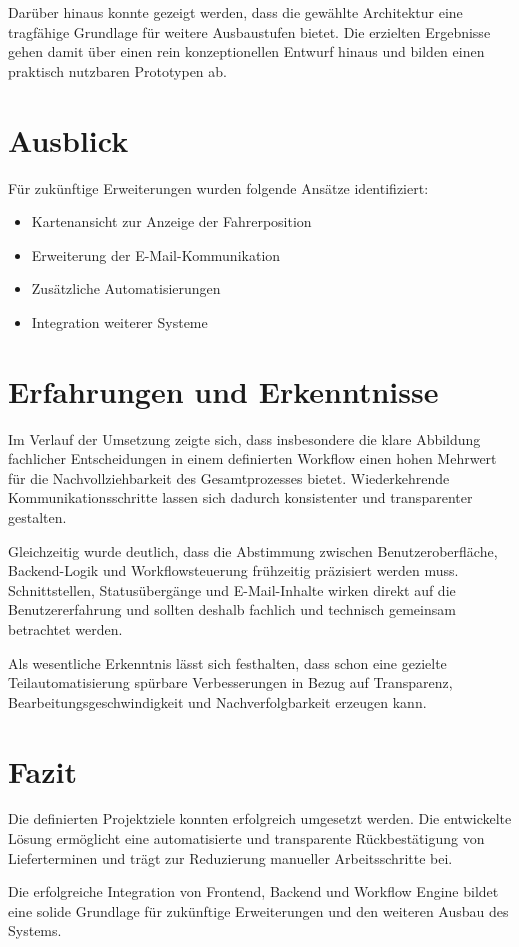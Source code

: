 \documentclass[
12pt,
a4paper
]{article}
\begin{document}
Darüber hinaus konnte gezeigt werden, dass die gewählte
Architektur eine tragfähige Grundlage für weitere
Ausbaustufen bietet. Die erzielten Ergebnisse gehen damit
über einen rein konzeptionellen Entwurf hinaus und bilden
einen praktisch nutzbaren Prototypen ab.

\section{Ausblick}

Für zukünftige Erweiterungen wurden folgende Ansätze
identifiziert:

\begin{itemize}
    \item Kartenansicht zur Anzeige der Fahrerposition
    \item Erweiterung der E-Mail-Kommunikation
    \item Zusätzliche Automatisierungen
    \item Integration weiterer Systeme
\end{itemize}

\section{Erfahrungen und Erkenntnisse}

Im Verlauf der Umsetzung zeigte sich, dass insbesondere die
klare Abbildung fachlicher Entscheidungen in einem definierten
Workflow einen hohen Mehrwert für die Nachvollziehbarkeit des
Gesamtprozesses bietet. Wiederkehrende Kommunikationsschritte
lassen sich dadurch konsistenter und transparenter gestalten.

Gleichzeitig wurde deutlich, dass die Abstimmung zwischen
Benutzeroberfläche, Backend-Logik und Workflowsteuerung
frühzeitig präzisiert werden muss. Schnittstellen,
Statusübergänge und E-Mail-Inhalte wirken direkt auf die
Benutzererfahrung und sollten deshalb fachlich und technisch
gemeinsam betrachtet werden.

Als wesentliche Erkenntnis lässt sich festhalten, dass schon
eine gezielte Teilautomatisierung spürbare Verbesserungen in
Bezug auf Transparenz, Bearbeitungsgeschwindigkeit und
Nachverfolgbarkeit erzeugen kann.

\section{Fazit}

Die definierten Projektziele konnten erfolgreich umgesetzt
werden. Die entwickelte Lösung ermöglicht eine automatisierte
und transparente Rückbestätigung von Lieferterminen und trägt
zur Reduzierung manueller Arbeitsschritte bei.

Die erfolgreiche Integration von Frontend, Backend und
Workflow Engine bildet eine solide Grundlage für zukünftige
Erweiterungen und den weiteren Ausbau des Systems.
\end{document}

